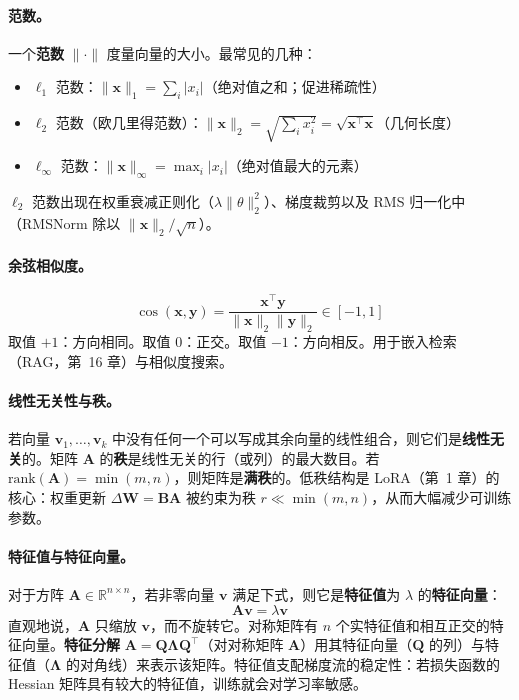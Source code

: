 \paragraph{范数。}
一个\textbf{范数} $\|\cdot\|$ 度量向量的大小。最常见的几种：
\begin{itemize}
  \item $\ell_1$ 范数：$\|\mathbf{x}\|_1 = \sum_i |x_i|$（绝对值之和；促进稀疏性）
  \item $\ell_2$ 范数（欧几里得范数）：$\|\mathbf{x}\|_2 = \sqrt{\sum_i x_i^2} = \sqrt{\mathbf{x}^\top\mathbf{x}}$（几何长度）
  \item $\ell_\infty$ 范数：$\|\mathbf{x}\|_\infty = \max_i |x_i|$（绝对值最大的元素）
\end{itemize}
$\ell_2$ 范数出现在权重衰减正则化（$\lambda\|\theta\|_2^2$）、梯度裁剪以及 RMS 归一化中（RMSNorm 除以 $\|\mathbf{x}\|_2 / \sqrt{n}$）。

\paragraph{余弦相似度。}
\[
\cos(\mathbf{x}, \mathbf{y}) = \frac{\mathbf{x}^\top \mathbf{y}}{\|\mathbf{x}\|_2 \|\mathbf{y}\|_2} \in [-1, 1]
\]
取值 $+1$：方向相同。取值 $0$：正交。取值 $-1$：方向相反。用于嵌入检索（RAG，第~16 章）与相似度搜索。

\paragraph{线性无关性与秩。}
若向量 $\mathbf{v}_1, \ldots, \mathbf{v}_k$ 中没有任何一个可以写成其余向量的线性组合，则它们是\textbf{线性无关}的。矩阵 $\mathbf{A}$ 的\textbf{秩}是线性无关的行（或列）的最大数目。若 $\mathrm{rank}(\mathbf{A}) = \min(m, n)$，则矩阵是\textbf{满秩}的。低秩结构是 LoRA（第~1 章）的核心：权重更新 $\Delta\mathbf{W} = \mathbf{B}\mathbf{A}$ 被约束为秩 $r \ll \min(m,n)$，从而大幅减少可训练参数。

\paragraph{特征值与特征向量。}
对于方阵 $\mathbf{A} \in \mathbb{R}^{n \times n}$，若非零向量 $\mathbf{v}$ 满足下式，则它是\textbf{特征值}为 $\lambda$ 的\textbf{特征向量}：
\[
\mathbf{A}\mathbf{v} = \lambda\mathbf{v}
\]
直观地说，$\mathbf{A}$ 只缩放 $\mathbf{v}$，而不旋转它。对称矩阵有 $n$ 个实特征值和相互正交的特征向量。\textbf{特征分解} $\mathbf{A} = \mathbf{Q}\boldsymbol{\Lambda}\mathbf{Q}^\top$（对对称矩阵 $\mathbf{A}$）用其特征向量（$\mathbf{Q}$ 的列）与特征值（$\boldsymbol{\Lambda}$ 的对角线）来表示该矩阵。特征值支配梯度流的稳定性：若损失函数的 Hessian 矩阵具有较大的特征值，训练就会对学习率敏感。

